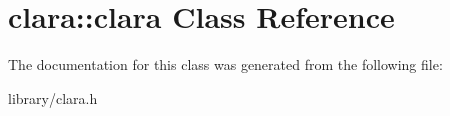 \hypertarget{classclara_1_1clara}{}\section{clara\+:\+:clara Class Reference}
\label{classclara_1_1clara}


The documentation for this class was generated from the following file\+:\begin{DoxyCompactItemize}
\item 
library/clara.\+h\end{DoxyCompactItemize}
